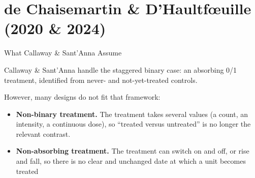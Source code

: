 \documentclass[main.tex]{subfiles}
\begin{document}
\section{de Chaisemartin \& D'Haultf\oe{}uille (2020 \& 2024)}

\begin{frame}{What Callaway \& Sant'Anna Assume}

  Callaway \& Sant'Anna handle the staggered binary case: an absorbing 0/1
  treatment, identified from never- and not-yet-treated controls.

  \medskip
  However, many designs do not fit that framework:
  \begin{itemize}
    \item \textbf{Non-binary treatment.} The treatment takes several values
      (a count, an intensity, a continuous dose), so ``treated versus
      untreated'' is no longer the relevant contrast.
    \item \textbf{Non-absorbing treatment.} The treatment can switch on and off,
      or rise and fall, so there is no clear and unchanged date at which a unit becomes
      treated
  \end{itemize}

 

\end{frame}
\end{document}
